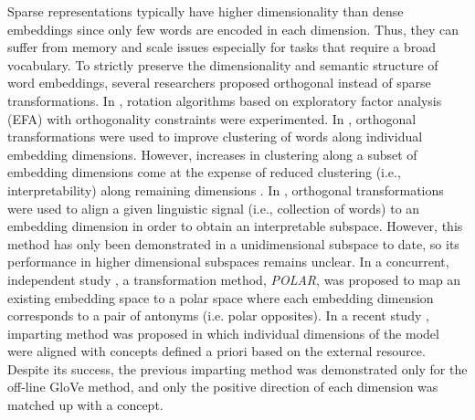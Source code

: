 \documentclass[11pt,a4paper]{article}
\begin{document}
Sparse representations typically have higher dimensionality than dense embeddings since only few words are encoded in each dimension. Thus, they can suffer from memory and scale issues especially for tasks that require a broad vocabulary. 
To strictly preserve the dimensionality and semantic structure of word embeddings, several researchers proposed orthogonal instead of sparse transformations. In \citet{park17rotated}, rotation algorithms based on exploratory factor analysis (EFA) with orthogonality constraints were experimented. In \citet{zobnin17rotations}, orthogonal transformations were used to improve clustering of words along individual embedding dimensions. However, increases in clustering along a subset of embedding dimensions come at the expense of reduced clustering (i.e., interpretability) along remaining dimensions \citep{zobnin17rotations}. In \citet{dufter19ultraDense}, orthogonal transformations were used to align a given linguistic signal (i.e., collection of words) to an embedding dimension in order to obtain an interpretable subspace. However, this method has only been demonstrated in a unidimensional subspace to date, so its performance in higher dimensional subspaces remains unclear. In a concurrent, independent study \citep{mathew20polar}, a transformation method, \textit{POLAR}, was proposed to map an existing embedding space to a polar space where each embedding dimension corresponds to a pair of antonyms (i.e. polar opposites).
In a recent study \citep{senel20impart}, imparting method was proposed in which individual dimensions of the model were aligned with concepts defined a priori based on the external resource. Despite its success, the previous imparting method was demonstrated only for the off-line GloVe method, and only the positive direction of each dimension was matched up with a concept. 
\end{document}
